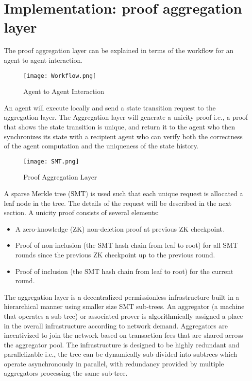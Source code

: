\documentclass{article}
\begin{document}
\section{Implementation: proof aggregation layer}

The proof aggregation layer can be explained in terms of the workflow for an agent to agent interaction.

\begin{figure}[H]
    \centering
    \texttt{[image: Workflow.png]}
    \caption{Agent to Agent Interaction}
    \label{fig:Workflow}
\end{figure}


An agent will execute locally and send a state transition request to the aggregation layer. The Aggregation layer will generate a unicity proof i.e., a proof that shows the state transition is unique, and return it to the agent who then synchronizes its state with a recipient agent who can verify both the correctness of the agent computation and the uniqueness of the state history.



\begin{figure}[htbp]
    \centering
    \texttt{[image: SMT.png]}
    \caption{Proof Aggregation Layer}
    \label{fig:SMT}
\end{figure}


A sparse Merkle tree (SMT) is used such that each unique request is allocated a leaf node in the tree. The details of the request will be described in the next section. A unicity proof consists of several elements:

\begin{itemize}
    \item A zero-knowledge (ZK) non-deletion proof at previous ZK checkpoint.
    \item Proof of non-inclusion (the SMT hash chain from leaf to root) for all SMT rounds since the previous ZK checkpoint up to the previous round.
    \item Proof of inclusion (the SMT hash chain from leaf to root) for the current round.
\end{itemize}


The aggregation layer is a decentralized permissionless infrastructure built in a hierarchical manner using smaller size SMT sub-trees. An aggregator (a machine that operates a sub-tree) or associated prover is algorithmically assigned a place in the overall infrastructure according to network demand. Aggregators are incentivized to join the network based on transaction fees that are shared across the aggregator pool. The infrastructure is designed to be highly redundant and parallelizable i.e., the tree can be dynamically sub-divided into subtrees which operate asynchronously in parallel, with redundancy provided by multiple aggregators processing the same sub-tree.
\end{document}
